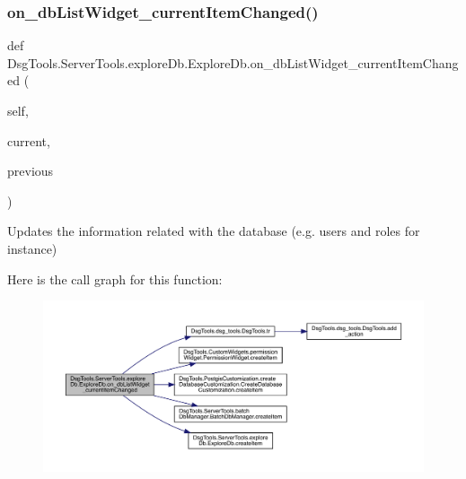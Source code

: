 \subsubsection{\texorpdfstring{on\+\_\+db\+List\+Widget\+\_\+current\+Item\+Changed()}{on\_dbListWidget\_currentItemChanged()}}
{\footnotesize\ttfamily def Dsg\+Tools.\+Server\+Tools.\+explore\+Db.\+Explore\+Db.\+on\+\_\+db\+List\+Widget\+\_\+current\+Item\+Changed (\begin{DoxyParamCaption}\item[{}]{self,  }\item[{}]{current,  }\item[{}]{previous }\end{DoxyParamCaption})}

\begin{DoxyVerb}Updates the information related with the database (e.g. users and roles for instance)
\end{DoxyVerb}
 Here is the call graph for this function\+:
\nopagebreak
\begin{figure}[H]
\begin{center}
\leavevmode
\includegraphics[width=350pt]{class_dsg_tools_1_1_server_tools_1_1explore_db_1_1_explore_db_a2da649b909fe26258c7bbc69063b6a50_cgraph}
\end{center}
\end{figure}
\mbox{\label{class_dsg_tools_1_1_server_tools_1_1explore_db_1_1_explore_db_af889de9b8f68501bb60a088fe1523d5a}} 
